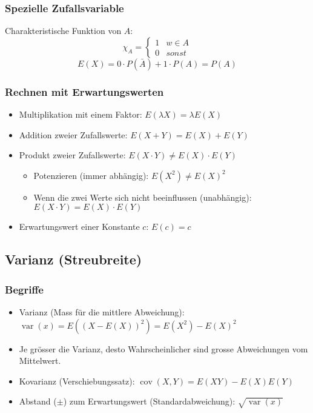 \subsubsection{Spezielle Zufallsvariable}
Charakteristische Funktion von $A$:
\[ \chi_A = \begin{cases}1 & w \in A \\ 0 & sonst \end{cases} \]
\[ E(X) = 0 \cdot P(\bar{A}) + 1 \cdot P(A) = P(A) \]

\subsubsection{Rechnen mit Erwartungswerten}
\begin{itemize}
  \item Multiplikation mit einem Faktor: $E(\lambda X) = \lambda E(X)$
  \item Addition zweier Zufallswerte: $E(X + Y) = E(X) + E(Y)$
  \item Produkt zweier Zufallswerte: $E(X \cdot Y) \ne E(X) \cdot E(Y)$
  \begin{itemize}
    \item Potenzieren (immer abhängig): $E(X^2) \ne E(X)^2$
    \item Wenn die zwei Werte sich nicht beeinflussen
      (unabhängig): $E(X \cdot Y) = E(X) \cdot E(Y)$
  \end{itemize}
  \item Erwartungswert einer Konstante $c$: $E(c) = c$
\end{itemize}

\subsection{Varianz (Streubreite)}
\subsubsection{Begriffe}
\begin{itemize}
  \item Varianz (Mass für die mittlere Abweichung):
    $\operatorname{var}(x) = E((X - E(X))^2) = E(X^2) - E(X)^2$
  \item Je grösser die Varianz, desto Wahrscheinlicher sind grosse
    Abweichungen vom Mittelwert.
  \item Kovarianz (Verschiebungssatz):
    $\operatorname{cov}(X,Y) = E(XY) - E(X)E(Y)$
  \item Abstand ($\pm$) zum Erwartungswert (Standardabweichung):
  $\sqrt{\operatorname{var}(x)}$
\end{itemize}
